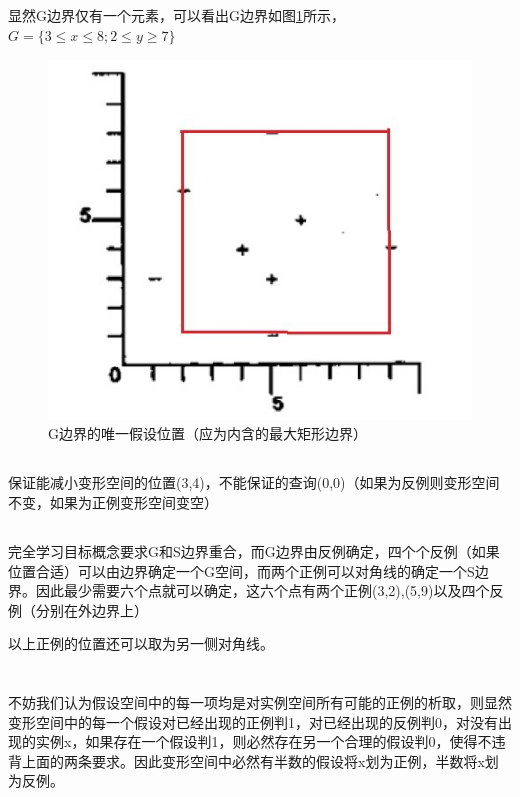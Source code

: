 \documentclass[UTF8,a4paper]{paper}
\begin{document}
\begin{multicols}{2}
\subsection{}
显然G边界仅有一个元素，可以看出G边界如图\ref{f2}所示，$G=\{3\le x \le 8;2 \le y \ge 7\}$
\begin{figure}[H]
\centering
\includegraphics[width=\columnwidth]{2.jpg}
\caption{G边界的唯一假设位置（应为内含的最大矩形边界）}
\label{f2}
\end{figure}
\end{multicols}
\subsection{}
保证能减小变形空间的位置(3,4)，不能保证的查询(0,0)（如果为反例则变形空间不变，如果为正例变形空间变空）
\subsection{}
完全学习目标概念要求G和S边界重合，而G边界由反例确定，四个个反例（如果位置合适）可以由边界确定一个G空间，而两个正例可以对角线的确定一个S边界。因此最少需要六个点就可以确定，这六个点有两个正例(3,2),(5,9)以及四个反例（分别在外边界上）

以上正例的位置还可以取为另一侧对角线。

\section{}
不妨我们认为假设空间中的每一项均是对实例空间所有可能的正例的析取，则显然变形空间中的每一个假设对已经出现的正例判1，对已经出现的反例判0，对没有出现的实例x，如果存在一个假设判1，则必然存在另一个合理的假设判0，使得不违背上面的两条要求。因此变形空间中必然有半数的假设将x划为正例，半数将x划为反例。
\end{document}
